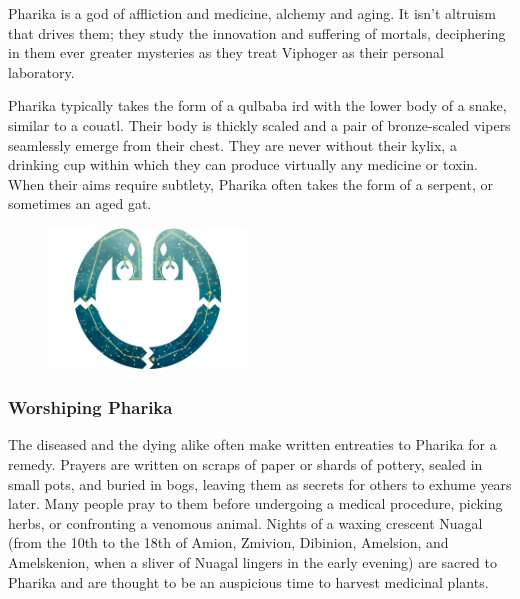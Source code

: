     Pharika is a god of affliction and medicine, alchemy and aging.
    It isn't altruism that drives them; they study the innovation and suffering of mortals, deciphering in them ever greater mysteries as they treat Viphoger as their personal laboratory.

    Pharika typically takes the form of a qulbaba ird with the lower body of a snake, similar to a couatl.
    Their body is thickly scaled and a pair of bronze-scaled vipers seamlessly emerge from their chest.
    They are never without their kylix, a drinking cup within which they can produce virtually any medicine or toxin.
    When their aims require subtlety, Pharika often takes the form of a serpent, or sometimes an aged gat.


    \begin{figure}[t]
        \centering
        \includegraphics[width=0.47\textwidth]{02viphoger/img/10s_pharika.png}
    \end{figure}

    \subsubsection{Worshiping Pharika}
        The diseased and the dying alike often make written entreaties to Pharika for a remedy.
        Prayers are written on scraps of paper or shards of pottery, sealed in small pots, and buried in bogs, leaving them as secrets for others to exhume years later.
        Many people pray to them before undergoing a medical procedure, picking herbs, or confronting a venomous animal.
        Nights of a waxing crescent Nuagal (from the 10th to the 18th of Amion, Zmivion, Dibinion, Amelsion, and Amelskenion, when a sliver of Nuagal lingers in the early evening) are sacred to Pharika and are thought to be an auspicious time to harvest medicinal plants.

